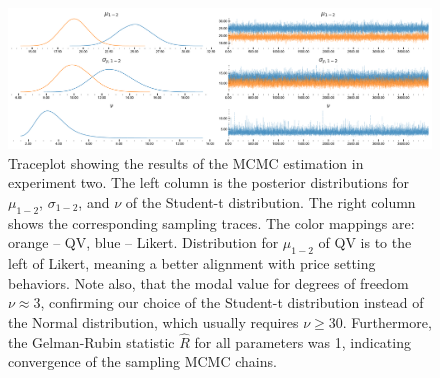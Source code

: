 \begin{figure}
  \centering
  \includegraphics[trim= 0in 0in 0in 0in, clip, width=\textwidth, keepaspectratio=true]{content/image/StudentTIndep_traceplot.pdf}
  \caption{
    Traceplot showing the results of the MCMC estimation in experiment two. The left column is the posterior distributions for $\mu_{1-2}$, $\sigma_{1-2}$, and $\nu$ of the Student-t distribution. The right column shows the corresponding sampling traces. The color mappings are: orange -- QV, blue -- Likert. Distribution for $\mu_{1-2}$ of QV is to the left of Likert, meaning a better alignment with price setting behaviors. Note also, that the modal value for degrees of freedom $\nu \approx 3$, confirming our choice of the Student-t distribution instead of the Normal distribution, which usually requires $\nu \geq 30$. Furthermore, the Gelman-Rubin statistic $\hat{R}$ for all parameters was 1, indicating  convergence of the sampling MCMC chains.
  }
  \label{fig:traceplot_exp2}
\end{figure}